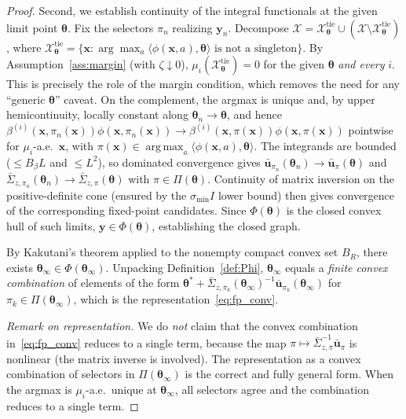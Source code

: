 \documentclass[11pt]{article}
\DeclareMathOperator*{\argmax}{arg\,max}
\begin{document}
\begin{proof}
Second, we establish continuity of the integral functionals at the
given limit point $\bm{\theta}$.  Fix the selectors $\pi_n$ realizing
$\bm{y}_n$.  Decompose
$\mathcal{X}=\mathcal{X}^{\mathrm{tie}}_{\bm{\theta}}\cup
(\mathcal{X}\setminus\mathcal{X}^{\mathrm{tie}}_{\bm{\theta}})$, where
$\mathcal{X}^{\mathrm{tie}}_{\bm{\theta}}=\{\bm{x}:
\arg\max_a\langle\phi(\bm{x},a),\bm{\theta}\rangle
\text{ is not a singleton}\}$.
By Assumption~\ref{ass:margin} (with $\zeta\downarrow 0$),
$\mu_i(\mathcal{X}^{\mathrm{tie}}_{\bm{\theta}})=0$ for the given
$\bm{\theta}$ \emph{and every} $i$. This is precisely the role of
the margin condition, which removes the need for any ``generic
$\bm{\theta}$'' caveat.  On the complement, the argmax is unique and,
by upper hemicontinuity, locally constant along
$\bm{\theta}_n\to\bm{\theta}$, and hence
$\beta^{(i)}(\bm{x},\pi_n(\bm{x}))\phi(\bm{x},\pi_n(\bm{x}))\to
\beta^{(i)}(\bm{x},\pi(\bm{x}))\phi(\bm{x},\pi(\bm{x}))$ pointwise for
$\mu_i$-a.e.\ $\bm{x}$, with $\pi(\bm{x})\in\argmax_a\langle\phi(\bm{x},a),
\bm{\theta}\rangle$.  The integrands are bounded ($\leq B_\beta L$ and
$\leq L^2$), so dominated convergence gives
$\bar{\bm{u}}_{\pi_n}(\bm{\theta}_n)\to\bar{\bm{u}}_\pi(\bm{\theta})$
and
$\bar{\Sigma}_{z,\pi_n}(\bm{\theta}_n)\to\bar{\Sigma}_{z,\pi}(\bm{\theta})$
with $\pi\in\Pi(\bm{\theta})$.
Continuity of matrix inversion on the positive-definite cone
(ensured by the $\sigma_{\min}I$ lower bound) then gives
convergence of the corresponding fixed-point candidates.
Since $\Phi(\bm{\theta})$ is the closed convex hull of such limits,
$\bm{y}\in\Phi(\bm{\theta})$, establishing the closed graph.

By Kakutani's theorem applied to the nonempty compact convex set $B_R$,
there exists $\bm{\theta}_\infty\in\Phi(\bm{\theta}_\infty)$.
Unpacking Definition~\ref{def:Phi}, $\bm{\theta}_\infty$ equals a
\emph{finite convex combination} of elements of the form
$\bm{\theta}^{\!*}+\bar{\Sigma}_{z,\pi_k}(\bm{\theta}_\infty)^{-1}
\bar{\bm{u}}_{\pi_k}(\bm{\theta}_\infty)$
for $\pi_k\in\Pi(\bm{\theta}_\infty)$,
which is the representation~\eqref{eq:fp_conv}.

\emph{Remark on representation.}
We do \emph{not} claim that the convex combination in~\eqref{eq:fp_conv}
reduces to a single term, because the map
$\pi\mapsto\bar{\Sigma}_{z,\pi}^{-1}\bar{\bm{u}}_\pi$ is nonlinear
(the matrix inverse is involved).  The representation as a convex
combination of selectors in $\Pi(\bm{\theta}_\infty)$ is the correct
and fully general form.  When the argmax is $\mu_i$-a.e.\ unique at
$\bm{\theta}_\infty$, all selectors agree and the combination reduces
to a single term.
\end{proof}
\end{document}
